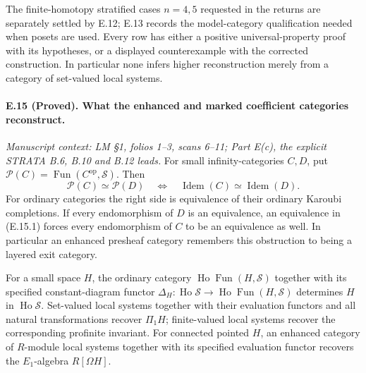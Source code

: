 The finite-homotopy stratified cases $n=4,5$ requested in the returns are separately settled by E.12; E.13 records the model-category qualification needed when posets are used. Every row has either a positive universal-property proof with its hypotheses, or a displayed counterexample with the corrected construction. In particular none infers higher reconstruction merely from a category of set-valued local systems.

\paragraph{E.15 (Proved). What the enhanced and marked coefficient categories reconstruct.}
\textit{Manuscript context: LM \S1, folios 1--3, scans 6--11;
Part E(c), the explicit STRATA B.6, B.10 and B.12 leads.}
For small infinity-categories $C,D$, put
$\mathcal P(C)=\operatorname{Fun}(C^{\mathrm{op}},\mathcal S)$.
Then
\[
 \mathcal P(C)\simeq\mathcal P(D)
 \quad\Longleftrightarrow\quad
 \operatorname{Idem}(C)\simeq\operatorname{Idem}(D).
                                                        \tag{E.15.1}
\]
For ordinary categories the right side is equivalence of their ordinary
Karoubi completions. If every endomorphism of $D$ is an equivalence,
an equivalence in (E.15.1) forces every endomorphism of $C$ to be an
equivalence as well. In particular an enhanced presheaf category
remembers this obstruction to being a layered exit category.

For a small space $H$, the ordinary category
$\operatorname{Ho}\operatorname{Fun}(H,\mathcal S)$ together with
its specified constant-diagram functor
$\Delta_H:\operatorname{Ho}\mathcal S\to
\operatorname{Ho}\operatorname{Fun}(H,\mathcal S)$ determines $H$
in $\operatorname{Ho}\mathcal S$. Set-valued local systems together
with their evaluation functors and all natural transformations recover
$\Pi_1H$; finite-valued local systems recover the corresponding
profinite invariant. For connected pointed $H$, an enhanced category
of $R$-module local systems together with its specified evaluation
functor recovers the $E_1$-algebra $R[\Omega H]$.


